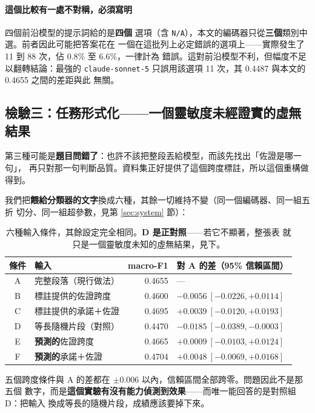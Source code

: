 \documentclass[11pt,a4paper]{ctexart}
\newcommand{\fn}[1]{\texttt{#1}}
\begin{document}
\paragraph{這個比較有一處不對稱，必須寫明} 四個前沿模型的提示詞給的是\textbf{四個}
選項（含 \fn{N/A}），本文的編碼器只從\textbf{三個}類別中選。前者因此可能把答案花在
一個在這批列上必定錯誤的選項上——實際發生了 11 到 88 次，佔 0.8\% 至 6.6\%，一律計為
錯誤。這對前沿模型不利，但幅度不足以翻轉結論：最強的
\fn{claude-sonnet-5} 只誤用該選項 11 次，其 0.4487 與本文的 0.4655 之間的差距與此
無關。

\subsection{檢驗三：任務形式化——一個靈敏度未經證實的虛無結果}

第三種可能是\textbf{題目問錯了}：也許不該把整段丟給模型，而該先找出「佐證是哪一句」，
再只對那一句判斷品質。資料集正好提供了這個跨度標註，所以這個重構做得到。

\medskip
我們把\textbf{餵給分類器的文字}換成六種，其餘一切維持不變（同一個編碼器、同一組五折
切分、同一組超參數，見第 \ref{sec:system} 節）：

\begin{table}[h]
\centering\small
\begin{tabular}{@{}clrl@{}}
\toprule
條件 & 輸入 & macro-F1 & 對 A 的差（95\% 信賴區間）\\
\midrule
A & 完整段落（現行做法） & 0.4655 & --- \\
B & 標註提供的佐證跨度 & 0.4600 & $-0.0056\ [-0.0226, +0.0114]$ \\
C & 標註提供的承諾＋佐證 & 0.4695 & $+0.0039\ [-0.0120, +0.0193]$ \\
\rowcolor{yellow!15}
D & 等長隨機片段（對照） & 0.4470 & $\mathbf{-0.0185\ [-0.0389, -0.0003]}$ \\
E & \textbf{預測的}佐證跨度 & 0.4665 & $+0.0009\ [-0.0103, +0.0124]$ \\
F & \textbf{預測的}承諾＋佐證 & 0.4704 & $+0.0048\ [-0.0069, +0.0168]$ \\
\bottomrule
\end{tabular}
\caption{六種輸入條件，其餘設定完全相同。\textbf{D 是正對照}——若它不顯著，整張表
就只是一個靈敏度未知的虛無結果，見下。}
\end{table}

五個跨度條件與 A 的差都在 $\pm 0.006$ 以內，信賴區間全部跨零。問題因此不是那五個
數字，而是\textbf{這個實驗有沒有能力偵測到效果}——而唯一能回答的是對照組 D：把輸入
換成等長的隨機片段，成績應該要掉下來。
\end{document}
